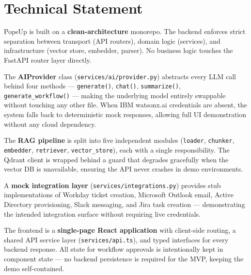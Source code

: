 \documentclass[10pt,a4paper]{article}
\begin{document}
\section{Technical Statement}

PopsUp is built on a \textbf{clean-architecture} monorepo. The backend enforces
strict separation between transport (API routers), domain logic (services), and
infrastructure (vector store, embedder, parser). No business logic touches the
FastAPI router layer directly.

The \textbf{AIProvider} class (\texttt{services/ai/provider.py}) abstracts every
LLM call behind four methods — \texttt{generate()}, \texttt{chat()},
\texttt{summarize()}, \texttt{generate\_workflow()} — making the underlying model
entirely swappable without touching any other file. When IBM watsonx.ai
credentials are absent, the system falls back to deterministic mock responses,
allowing full UI demonstration without any cloud dependency.

The \textbf{RAG pipeline} is split into five independent modules
(\texttt{loader}, \texttt{chunker}, \texttt{embedder}, \texttt{retriever},
\texttt{vector\_store}), each with a single responsibility. The Qdrant client
is wrapped behind a guard that degrades gracefully when the vector DB is
unavailable, ensuring the API never crashes in demo environments.

A \textbf{mock integration layer} (\texttt{services/integrations.py}) provides
stub implementations of Workday ticket creation, Microsoft Outlook email,
Active Directory provisioning, Slack messaging, and Jira task creation —
demonstrating the intended integration surface without requiring live
credentials.

The frontend is a \textbf{single-page React application} with client-side
routing, a shared API service layer (\texttt{services/api.ts}), and typed
interfaces for every backend response. All state for workflow approvals is
intentionally kept in component state — no backend persistence is required for
the MVP, keeping the demo self-contained.
\end{document}
